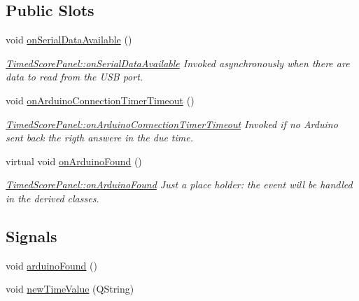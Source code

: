 \subsection*{Public Slots}
\begin{DoxyCompactItemize}
\item 
\mbox{\label{classTimedScorePanel_a1962b09445875f5d4766b03616a17b90}} 
void \mbox{\hyperlink{classTimedScorePanel_a1962b09445875f5d4766b03616a17b90}{on\+Serial\+Data\+Available}} ()
\begin{DoxyCompactList}\small\item\em \mbox{\hyperlink{classTimedScorePanel_a1962b09445875f5d4766b03616a17b90}{Timed\+Score\+Panel\+::on\+Serial\+Data\+Available}} Invoked asynchronously when there are data to read from the U\+SB port. \end{DoxyCompactList}\item 
\mbox{\label{classTimedScorePanel_afbf7c67ae85927b3a81ead856373dba8}} 
void \mbox{\hyperlink{classTimedScorePanel_afbf7c67ae85927b3a81ead856373dba8}{on\+Arduino\+Connection\+Timer\+Timeout}} ()
\begin{DoxyCompactList}\small\item\em \mbox{\hyperlink{classTimedScorePanel_afbf7c67ae85927b3a81ead856373dba8}{Timed\+Score\+Panel\+::on\+Arduino\+Connection\+Timer\+Timeout}} Invoked if no Arduino sent back the rigth answere in the due time. \end{DoxyCompactList}\item 
\mbox{\label{classTimedScorePanel_ad7ab6b2d7de191d2d2bea1f32a34fce1}} 
virtual void \mbox{\hyperlink{classTimedScorePanel_ad7ab6b2d7de191d2d2bea1f32a34fce1}{on\+Arduino\+Found}} ()
\begin{DoxyCompactList}\small\item\em \mbox{\hyperlink{classTimedScorePanel_ad7ab6b2d7de191d2d2bea1f32a34fce1}{Timed\+Score\+Panel\+::on\+Arduino\+Found}} Just a place holder\+: the event will be handled in the derived classes. \end{DoxyCompactList}\end{DoxyCompactItemize}
\subsection*{Signals}
\begin{DoxyCompactItemize}
\item 
void \mbox{\hyperlink{classTimedScorePanel_aed0b9cf91221704fec13d1bf1d5e9f9e}{arduino\+Found}} ()
\item 
void \mbox{\hyperlink{classTimedScorePanel_a46c1848c7cdcff881036d476a78da36f}{new\+Time\+Value}} (Q\+String)
\end{DoxyCompactItemize}
